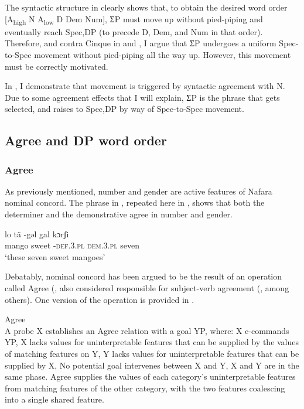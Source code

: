\documentclass[output=paper]{langscibook}
\begin{document}
The syntactic structure in  clearly shows that, to obtain the desired word order [A\textsubscript{high} N A\textsubscript{low} D Dem Num], ƩP must move up without pied-piping and eventually reach Spec,DP (to precede D, Dem, and Num in that order). Therefore, and contra Cinque in  and , I argue that ƩP undergoes a uniform Spec-to-Spec movement without pied-piping all the way up. However, this movement must be correctly motivated. 

In , I demonstrate that movement is triggered by syntactic agreement with N. Due to some agreement effects that I will explain, ƩP is the phrase that gets selected, and raises to Spec,DP by way of Spec-to-Spec movement.
 
\subsection{Agree and DP word order}
\label{sec:baron:2.3}
\subsubsection{Agree}

As previously mentioned, number and gender are active features of Nafara nominal concord. The phrase in , repeated here in , shows that both the determiner and the demonstrative agree in number and gender. 


\ea\label{ex:baron:17}
\gll lo tã -gəl gal kɔrʃi\\
   mango sweet -\textsc{def.3.pl} \textsc{dem.3.pl} seven\\
\glt ‘these seven sweet mangoes’
\z

Debatably, nominal concord has been argued to be the result of an operation called Agree (\citealt{Chomsky2000,Chomsky2001}, also considered responsible for subject-verb agreement (\citealt{Baker2008,Carstens2001,Collins2004}, among others). One version of the operation is provided in .


\begin{exe}\ex\label{ex:baron:18}
Agree \citep[26]{Norris2014}\\
A probe X establishes an Agree relation with a goal YP, where:
\xlista
\ex X c-commands YP,
\ex X lacks values for uninterpretable features that can be supplied by the values of  matching features on Y, 
\ex Y lacks values for uninterpretable features that can be supplied by X, 
\ex No potential goal intervenes between X and Y, 
\ex X and Y are in the same phase.
\endxlista
Agree supplies the values of each category’s uninterpretable features from matching features of the other category, with the two features coalescing into a single shared feature.
\end{exe}
\end{document}
